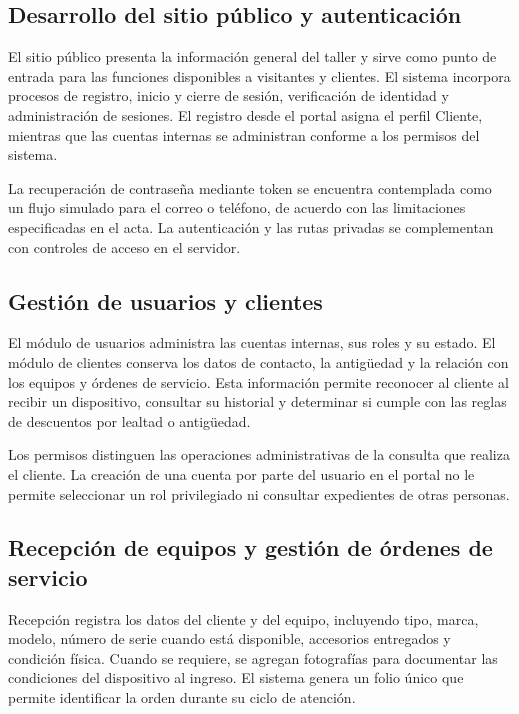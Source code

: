 \subsection{Desarrollo del sitio público y autenticación}

El sitio público presenta la información general del taller y sirve como punto de entrada para las funciones disponibles a visitantes y clientes. El sistema incorpora procesos de registro, inicio y cierre de sesión, verificación de identidad y administración de sesiones. El registro desde el portal asigna el perfil Cliente, mientras que las cuentas internas se administran conforme a los permisos del sistema.

La recuperación de contraseña mediante token se encuentra contemplada como un flujo simulado para el correo o teléfono, de acuerdo con las limitaciones especificadas en el acta. La autenticación y las rutas privadas se complementan con controles de acceso en el servidor.

\subsection{Gestión de usuarios y clientes}

El módulo de usuarios administra las cuentas internas, sus roles y su estado. El módulo de clientes conserva los datos de contacto, la antigüedad y la relación con los equipos y órdenes de servicio. Esta información permite reconocer al cliente al recibir un dispositivo, consultar su historial y determinar si cumple con las reglas de descuentos por lealtad o antigüedad.

Los permisos distinguen las operaciones administrativas de la consulta que realiza el cliente. La creación de una cuenta por parte del usuario en el portal no le permite seleccionar un rol privilegiado ni consultar expedientes de otras personas.

\subsection{Recepción de equipos y gestión de órdenes de servicio}

Recepción registra los datos del cliente y del equipo, incluyendo tipo, marca, modelo, número de serie cuando está disponible, accesorios entregados y condición física. Cuando se requiere, se agregan fotografías para documentar las condiciones del dispositivo al ingreso. El sistema genera un folio único que permite identificar la orden durante su ciclo de atención.

